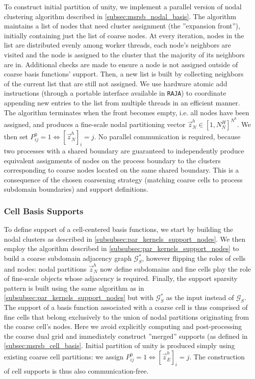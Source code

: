 To construct initial partition of unity, we implement a parallel version of nodal clustering algorithm described in \autoref{subsec:msrsb_nodal_basis}.   The algorithm maintains a list of nodes that need cluster assignment (the ''expansion front''), initially containing just the list of coarse nodes.   At every iteration, nodes in the list are distributed evenly among worker threads, each node's neighbors are visited and the node is assigned to the cluster that the majority of its neighbors are in.   Additional checks are made to ensure a node is not assigned outside of coarse basis functions' support.   Then, a new list is built by collecting neighbors of the current list that are still not assigned.   We use hardware atomic add instructions (through a portable interface available in \texttt{RAJA}) to coordinate appending new entries to the list from multiple threads in an efficient manner.   The algorithm terminates when the front becomes empty, i.e. all nodes have been assigned, and produces a fine-scale nodal partitioning vector $\vec{z}_N^h \in [1,N_N^H]^{N^h}$.    We then set $P_{ij}^0 = 1 \Leftrightarrow [\vec{z}_N^h]_i = j$.   No parallel communication is required, because two processes with a shared boundary are guaranteed to independently produce equivalent assignments of nodes on the process boundary to the clusters corresponding to coarse nodes located on the same shared boundary.   This is a consequence of the chosen coarsening strategy (matching coarse cells to process subdomain boundaries) and support definitions.

\subsubsection{Cell Basis Supports}
\label{subsubsec:par_kernels_support_cells}

To define support of a cell-centered basis functions, we start by building the nodal clusters as described in \autoref{subsubsec:par_kernels_support_nodes}.   We then employ the algorithm described in \autoref{subsubsec:par_kernels_support_nodes} to build a coarse subdomain adjacency graph $\mathcal{G}_S^*$, however flipping the roles of cells and nodes: nodal partitions $\vec{z}_N^h$ now define subdomains and fine cells play the role of fine-scale objects whose adjacency is required.   Finally, the support sparsity pattern is built using the same algorithm as in \autoref{subsubsec:par_kernels_support_nodes} but with $\mathcal{G}_S^*$ as the input instead of $\mathcal{G}_S$.   The support of a basis function associated with a coarse cell is thus comprised of fine cells that belong exclusively to the union of nodal partitions originating from the coarse cell's nodes.   Here we avoid explicitly computing and post-processing the coarse dual grid and immediately construct ''merged'' supports (as defined in \autoref{subsec:msrsb_cell_basis}.   Initial partition of unity is produced simply using existing coarse cell partitions: we assign $P_{ij}^0 = 1 \Leftrightarrow [\vec{z}_E^h]_i = j$.   The construction of cell supports is thus also communication-free.

